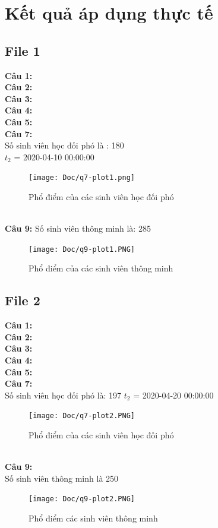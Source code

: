 \documentclass[12pt,a4paper]{article}  %
\begin{document}
\section{Kết quả áp dụng thực tế}
\subsection{File 1}
\textbf{Câu 1: }\\
\textbf{Câu 2: }\\
\textbf{Câu 3: }\\
\textbf{Câu 4: }\\
\textbf{Câu 5: }\\
\textbf{Câu 7: } \\
\noindent Số sinh viên học đối phó là : 180\\
\noindent $t_2$ = 2020-04-10 00:00:00 \\
\begin{figure}[!ht]
    \centering
    \texttt{[image: Doc/q7-plot1.png]}
    \caption{Phổ điểm của các sinh viên học đối phó}
    \label{fig:my_label}
\end{figure}
\\
\textbf{Câu 9: } 
\noindent Số sinh viên thông minh là: 285
\begin{figure}[!ht]
    \centering
    \texttt{[image: Doc/q9-plot1.PNG]}
    \caption{Phổ điểm của các sinh viên thông minh}
    \label{fig:my_label}
\end{figure}
\newpage
\subsection{File 2}
\textbf{Câu 1: }\\
\textbf{Câu 2: }\\
\textbf{Câu 3: }\\
\textbf{Câu 4: }\\
\textbf{Câu 5: }\\
\textbf{Câu 7: }\\
\noindent Số sinh viên học đối phó là: 197
\noindent $t_2$ = 2020-04-20 00:00:00
\begin{figure}[!ht]
    \centering
    \texttt{[image: Doc/q7-plot2.PNG]}
    \caption{Phổ điểm của các sinh viên học đối phó}
    \label{fig:my_label}
\end{figure}
\\
\textbf{Câu 9: }\\
\noindent Số sinh viên thông minh là 250
\begin{figure}[!ht]
    \centering
    \texttt{[image: Doc/q9-plot2.PNG]}
    \caption{Phổ điểm các sinh viên thông minh}
    \label{fig:my_label}
\end{figure}
\newpage
\end{document}
